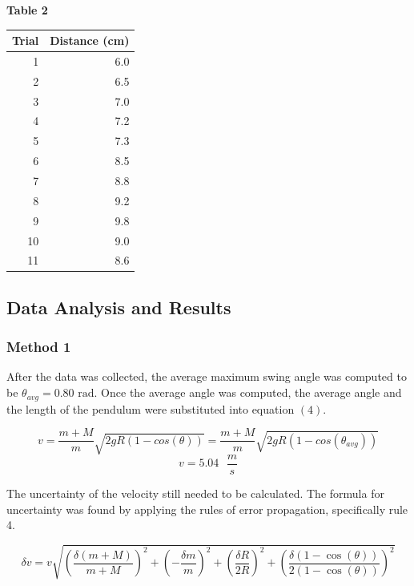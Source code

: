 \documentclass[11pt]{article}
\begin{document}
\begin{center}
\textbf{Table 2}

\begin{tabular}{rr}
\toprule
 Trial &  Distance (cm) \\
\midrule
     1 &            6.0 \\
     2 &            6.5 \\
     3 &            7.0 \\
     4 &            7.2 \\
     5 &            7.3 \\
     6 &            8.5 \\
     7 &            8.8 \\
     8 &            9.2 \\
     9 &            9.8 \\
    10 &            9.0 \\
    11 &            8.6 \\
\bottomrule
\end{tabular}
\end{center}

\hypertarget{data-analysis-and-results}{%
\subsection*{\centering Data Analysis and Results}\label{data-analysis-and-results}}

\hypertarget{method-1-2}{%
\subsubsection*{\centering Method 1}\label{method-1-2}}

After the data was collected, the average maximum swing angle was
computed to be \(\theta_{avg} =0.80\text{ rad}\). Once the average angle
was computed, the average angle and the length of the pendulum were
substituted into equation \((4)\).

\begin{equation}
v = \frac {m + M}{m} \sqrt {2gR(1 - cos(\theta))} = \frac {m + M}{m} \sqrt {2gR(1 - cos(\theta_{avg}))}
\end{equation}
\[
v = 5.04 \text{ }\frac {m}{s}
\]

The uncertainty of the velocity still needed to be calculated. The
formula for uncertainty was found by applying the rules of error
propagation, specifically rule 4.

\begin{equation}
\delta v = v \sqrt{(\frac{\delta(m + M)}{m + M})^2 + (-\frac{\delta m}{m})^2 + (\frac{\delta R}{2R})^2
+ (\frac{\delta(1 - \cos(\theta))}{2(1 - \cos(\theta))})^2}
\end{equation}
\end{document}
